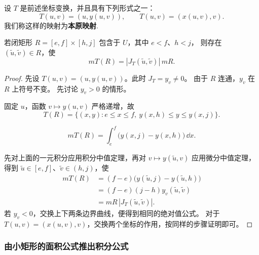 \begin{lemma}[保留一个坐标的变换]\label{p2-triangular-area}
设 $T$ 是前述坐标变换，并且具有下列形式之一：
\[
T(u,v)=(u,y(u,v)),\qquad T(u,v)=(x(u,v),v).
\]
我们称这样的映射为\textbf{本原映射}.

若闭矩形 $R=[e,f]\times[h,j]$ 包含于 $U$，其中 $e<f$、$h<j$，
则存在 $(\widetilde u,\widetilde v)\in R$，使
\[
mT(R)=|J_T(\widetilde u,\widetilde v)|\,mR.
\]
\end{lemma}
\begin{proof}
先设 $T(u,v)=(u,y(u,v))$。此时 $J_T=y_v\ne0$。
由于 $R$ 连通，$y_v$ 在 $R$ 上符号不变。
先讨论 $y_v>0$ 的情形。

固定 $u$，函数 $v\mapsto y(u,v)$ 严格递增，故
\[
T(R)=\{(x,y):e\le x\le f,\ y(x,h)\le y\le y(x,j)\}.
\]

\[
mT(R)=\int_e^f\bigl(y(x,j)-y(x,h)\bigr)\,\dd x.
\]

\begin{center}

\end{center}

先对上面的一元积分应用积分中值定理，再对 $v\mapsto y(\widetilde u,v)$
应用微分中值定理，得到 $\widetilde u\in[e,f]$、$\widetilde v\in(h,j)$，使
\begin{align*}
mT(R)
&=(f-e)\bigl(y(\widetilde u,j)-y(\widetilde u,h)\bigr)\\
&=(f-e)(j-h)y_v(\widetilde u,\widetilde v)\\
&=mR\,|J_T(\widetilde u,\widetilde v)|.
\end{align*}
若 $y_v<0$，交换上下两条边界曲线，便得到相同的绝对值公式。
对于 $T(u,v)=(x(u,v),v)$，交换两个坐标的作用，按同样的步骤证明即可。
\end{proof}

\subsubsection*{由小矩形的面积公式推出积分公式}

